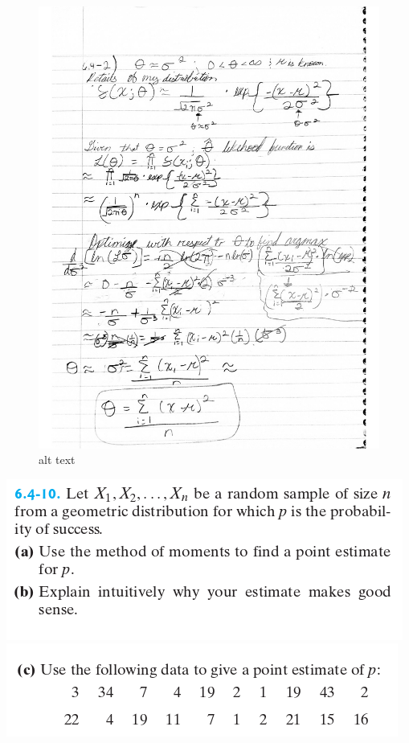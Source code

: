 \documentclass[11pt]{article}
\makeatletter
\def\maxwidth{\ifdim\Gin@nat@width>\linewidth\linewidth
    \else\Gin@nat@width\fi}
\let\Oldincludegraphics\includegraphics
\renewcommand{\includegraphics}[1]{\Oldincludegraphics[width=.8\maxwidth]{#1}}
\makeatother
\begin{document}
    \begin{figure}
\centering
\includegraphics{images/solution3.png}
\caption{alt text}
\end{figure}

    \includegraphics{images/num4.1.png} \includegraphics{images/num4.2.png}
\end{document}
